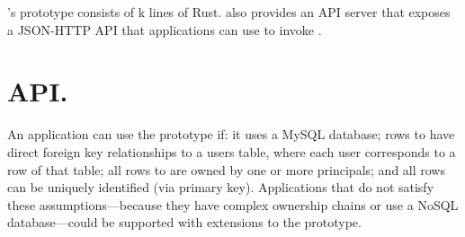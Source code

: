 %
\sys's prototype consists of k lines of Rust.
%
\sys also provides an API server that exposes a JSON-HTTP API that applications
can use to invoke \sys.
%


\section{API.}
\label{s:api}
%
An application can use the prototype if:
\one{} it uses a MySQL database;
\two{} rows to \xx have direct foreign key relationships to a users table,
where each user corresponds to a row of that table;
\three{} all rows to \xx are owned by one or more principals; and
\four{} all rows can be uniquely identified (\eg via primary key).
%
Applications that do not satisfy these assumptions---\eg because they have
complex ownership chains or use a NoSQL database---could be supported with
extensions to the prototype.

\iffalse
\begin{figure}[t]
\begin{lstlisting}[style=rust,escapeinside={(*}{*)}]
// Generates keypair for p and returns
// the user's backup credential
(*\textbf{RegisterPrincipal}*)(p: UID, pw: Password,
        pubkey: PublicKey, privkey: PrivKey)
    -> Credential;
// \xxs principal p according to the spec,
// optionally over already-\xxed data ((*\S\ref{s:composition}*))
(*\textbf{\xxData}*)(p: Option<UID>, spec: \xxSpec,
    \xx_over: Option<(
        Credential,
        Vec<Locator>
    )>) -> (\xxID, Vec<Locator>);
// Reveals data \xxed by s for p with p's
// private key.
// locs point to bags p can decrypt
(*\textbf{RevealData}*)(p: Option<UID>, s: \xxID,
    cred: Credential, locs: Vec<Locator>);
// Gets principals at loc that p can speak-for.
(*\textbf{CanSpeakFor}*)(p: UID, cred: Credential,
    loc: Locator) -> Vec<UID>;
\end{lstlisting}
\caption{\sys's high-level API (Rust-like syntax).}
\label{f:api-high}
\end{figure}
%
\fi


